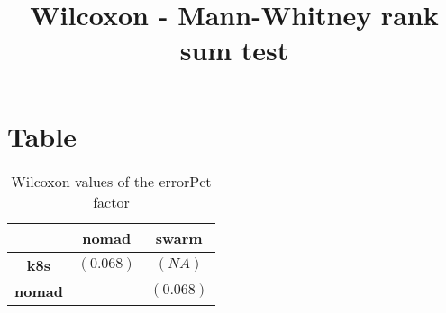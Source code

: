 \documentclass{article}
\title{Wilcoxon - Mann-Whitney rank sum test}
\author{}
\begin{document}
\maketitle
\section{Table}
\begin{table}[!htp]
  \caption{Wilcoxon values of the errorPct factor}
  \label{table:errorPct}
  \centering
  \begin{scriptsize}
  \begin{tabular}{c|cc}
      & \textbf{nomad} & \textbf{swarm} \\\hline
      \textbf{k8s} & $(0.068) $ & $ (NA)$ \\
      \textbf{nomad} & $ $ & $ (0.068)$ \\
  \end{tabular}
  \end{scriptsize}
\end{table}
\end{document}
